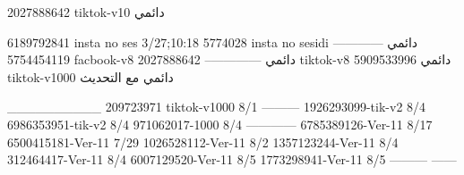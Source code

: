 2027888642 tiktok-v10
دائمي

6189792841 insta no ses
3/27;10:18
5774028 insta no sesidi
دائمي
------------
5754454119 facbook-v8
دائمي
--------------
2027888642 tiktok-v8
دائمي
5909533996 tiktok-v1000
دائمي مع التحديث

__________
209723971 tiktok-v1000
8/1
---------
1926293099-tik-v2
8/4
6986353951-tik-v2
8/4
971062017-1000
8/4
------------
6785389126-Ver-11
8/17
6500415181-Ver-11
7/29
1026528112-Ver-11
8/2
1357123244-Ver-11
8/4
312464417-Ver-11
8/4
6007129520-Ver-11
8/5
1773298941-Ver-11
8/5
---------
------

